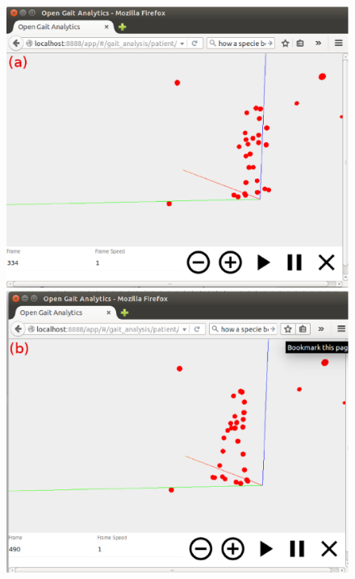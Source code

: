 \documentclass[journal]{IEEEtran}
\begin{document}
\begin{figure}[tb]
  \centering
  \begin{minipage}[b]{0.32\textwidth}
    \includegraphics[width=\textwidth]{./animation1.eps}
  \end{minipage}
  \hfill
  \begin{minipage}[b]{0.32\textwidth}
    \includegraphics[width=\textwidth]{./animation2.eps}
  \end{minipage}
  \hfill
  \begin{minipage}[b]{0.32\textwidth}

\end{minipage}
\end{figure}
\end{document}
